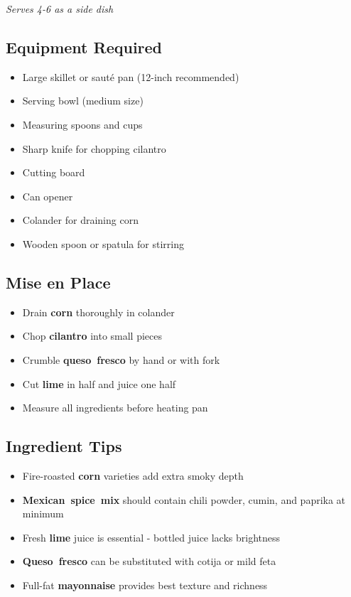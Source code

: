 \documentclass[11pt,letterpaper]{article}
\begin{document}
\textit{Serves 4-6 as a side dish}

\newpage

{\small
\setlength{\columnsep}{20pt}
\setlength{\multicolsep}{6pt}
\begin{multicols}{2}
\setlength{\parindent}{0pt}
\setlength{\parskip}{4pt}

\subsection*{Equipment Required}
\begin{itemize}
    \item Large skillet or sauté pan (12-inch recommended)
    \item Serving bowl (medium size)
    \item Measuring spoons and cups
    \item Sharp knife for chopping cilantro
    \item Cutting board
    \item Can opener
    \item Colander for draining corn
    \item Wooden spoon or spatula for stirring
\end{itemize}

\subsection*{Mise en Place}
\begin{itemize}
    \item Drain \textbf{corn} thoroughly in colander
    \item Chop \textbf{cilantro} into small pieces
    \item Crumble \textbf{queso~fresco} by hand or with fork
    \item Cut \textbf{lime} in half and juice one half
    \item Measure all ingredients before heating pan
\end{itemize}

\subsection*{Ingredient Tips}
\begin{itemize}
    \item Fire-roasted \textbf{corn} varieties add extra smoky depth
    \item \textbf{Mexican~spice~mix} should contain chili powder, cumin, and paprika at minimum
    \item Fresh \textbf{lime} juice is essential - bottled juice lacks brightness
    \item \textbf{Queso~fresco} can be substituted with cotija or mild feta
    \item Full-fat \textbf{mayonnaise} provides best texture and richness
\end{itemize}


\end{multicols}}
\end{document}
